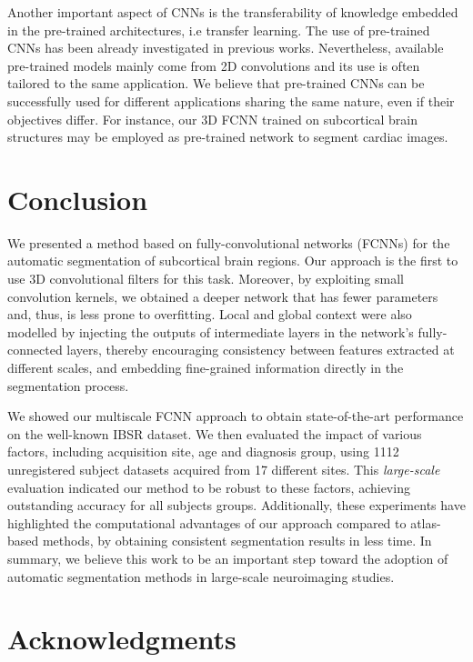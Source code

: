 \documentclass[twoside,fleqn,espcrc2]{elsarticle}
\begin{document}
Another important aspect of CNNs is the transferability of knowledge embedded in the pre-trained architectures, i.e transfer learning. The use of pre-trained CNNs has been already investigated in previous works. Nevertheless, available pre-trained models mainly come from 2D convolutions and its use is often tailored to the same application. We believe that pre-trained CNNs can be successfully used for different applications sharing the same nature, even if their objectives differ. For instance, our 3D FCNN trained on subcortical brain structures may be employed as pre-trained network to segment cardiac images.

\section{Conclusion}
\label{sec:conclusion}

We presented a method based on fully-convolutional networks (FCNNs) for the automatic segmentation of subcortical brain regions. Our approach is the first to use 3D convolutional filters for this task. Moreover, by exploiting small convolution kernels, we obtained a deeper network that has fewer parameters and, thus, is less prone to overfitting. Local and global context were also modelled by injecting the outputs of intermediate layers in the network's fully-connected layers, thereby encouraging consistency between features extracted at different scales, and embedding fine-grained information directly in the segmentation process.

We showed our multiscale FCNN approach to obtain state-of-the-art performance on the well-known IBSR dataset. We then evaluated the impact of various factors, including acquisition site, age and diagnosis group, using 1112 unregistered subject datasets acquired from 17 different sites. This \emph{large-scale} evaluation indicated our method to be robust to these factors, achieving outstanding accuracy for all subjects groups. Additionally, these experiments have highlighted the computational advantages of our approach compared to atlas-based methods, by obtaining consistent segmentation results in less time. In summary, we believe this work to be an important step toward the adoption of automatic segmentation methods in large-scale neuroimaging studies.

\section*{Acknowledgments}
\end{document}
